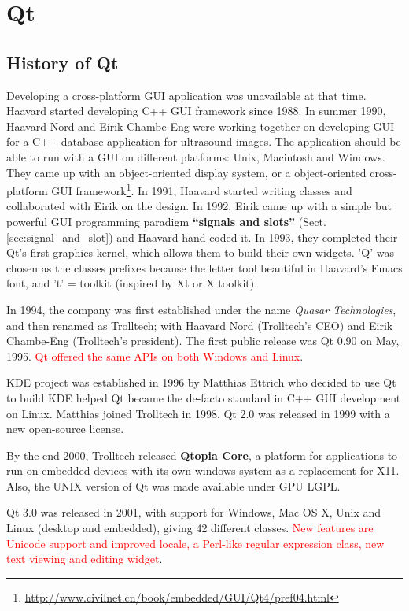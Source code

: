 \chapter{Qt}
\label{chap:Qt}

\section{History of Qt}

Developing a cross-platform GUI application was unavailable at that time.
Haavard started developing C++ GUI framework since 1988. In summer 1990, Haavard
Nord and Eirik Chambe-Eng were working together on developing GUI for a C++
database application for ultrasound images. The application should be able to
run with a GUI on different platforms:
Unix, Macintosh and Windows. They came up with an object-oriented display
system, or a object-oriented cross-platform GUI
framework\footnote{\url{http://www.civilnet.cn/book/embedded/GUI/Qt4/pref04.html}}.
In 1991, Haavard started writing classes and collaborated with Eirik on the
design. In 1992, Eirik came up with a simple but powerful GUI programming
paradigm {\bf ``signals and slots''} (Sect.\ref{sec:signal_and_slot}) and
Haavard hand-coded it. In 1993, they completed their Qt's first graphics kernel,
which allows them to build their own widgets. 'Q' was chosen as the classes
prefixes because the letter tool beautiful in Haavard's Emacs font, and 't' =
toolkit (inspired by Xt or X toolkit).

In 1994, the company was first established under the name {\it Quasar
Technologies}, and then renamed as Trolltech; with Haavard Nord (Trolltech's
CEO) and Eirik Chambe-Eng (Trolltech's president). The first public release was
Qt 0.90 on May, 1995. \textcolor{red}{Qt offered the same APIs on both Windows
and Linux}.

KDE project was established in 1996 by Matthias Ettrich who decided to use Qt to
build KDE helped Qt became the de-facto standard in C++ GUI development on
Linux. Matthias joined Trolltech in 1998. Qt 2.0 was released in 1999 with a new
open-source license.

By the end 2000, Trolltech released {\bf Qtopia Core}, a platform for
applications to run on embedded devices with its own windows system as a
replacement for X11. Also, the UNIX version of Qt was made available under GPU
LGPL.

Qt 3.0 was released in 2001, with support for Windows, Mac OS X, Unix and Linux
(desktop and embedded), giving 42 different classes. \textcolor{red}{New
features are Unicode support and improved locale, a Perl-like regular expression
class, new text viewing and editing widget}.

